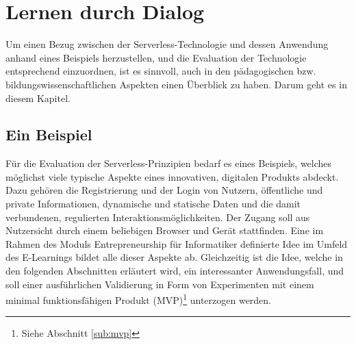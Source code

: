 \chapter{Lernen durch Dialog}

Um einen Bezug zwischen der Serverless-Technologie und dessen Anwendung anhand eines Beispiels herzustellen, und die Evaluation der Technologie entsprechend einzuordnen, ist es sinnvoll, auch in den pädagogischen bzw. bildungswissenschaftlichen Aspekten einen Überblick zu haben. Darum geht es in diesem Kapitel.

\section{Ein Beispiel}
Für die Evaluation der Serverless-Prinzipien bedarf es eines Beispiels, welches möglichst viele typische Aspekte eines innovativen, digitalen Produkts abdeckt. Dazu gehören die Registrierung und der Login von Nutzern, öffentliche und private Informationen, dynamische und statische Daten und die damit verbundenen, regulierten Interaktionsmöglichkeiten. Der Zugang soll aus Nutzersicht durch einem beliebigen Browser und Gerät stattfinden. Eine im Rahmen des Moduls Entrepreneurship für Informatiker definierte Idee im Umfeld des E-Learnings bildet alle dieser Aspekte ab. Gleichzeitig ist die Idee, welche in den folgenden Abschnitten erläutert wird, ein interessanter Anwendungsfall, und soll einer ausführlichen Validierung in Form von Experimenten mit einem minimal funktionsfähigen Produkt (MVP)\footnote{Siehe Abschnitt \ref{sub:mvp}} unterzogen werden.

